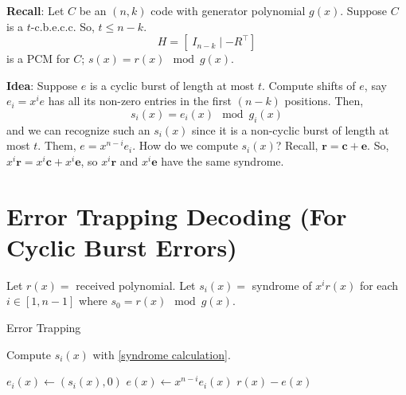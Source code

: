 \textbf{Recall}: Let $ C $ be an $ (n,k) $ code with generator polynomial
$ g(x) $. Suppose $ C $ is a $ t $-c.b.e.c.c. So, $ t\leqslant n-k $.
\[ H=\left[ \; I_{n-k}\mid -R^\top \right] \]
is a PCM for $ C $; $ s(x)=r(x)\mod g(x) $.

\textbf{Idea}: Suppose $ e $ is a cyclic burst of length at most $ t $.
Compute shifts of $ e $, say $ e_i=x^i e $ has all its non-zero entries in the first
$ (n-k) $ positions. Then,
\[ s_i(x)=e_i(x)\mod g_i(x) \]
and we can recognize such an $ s_i(x) $ since it is a non-cyclic burst of length
at most $ t $. Them, $ e=x^{n-i}e_i $. How do we compute $ s_i(x) $? Recall,
$ \bm{r}=\bm{c}+\bm{e} $. So, $ x^i \bm{r}=x^i\bm{c}+x^i\bm{e} $, so
$ x^i \bm{r} $ and $ x^i\bm{e} $ have the same syndrome.

\section{Error Trapping Decoding (For Cyclic Burst Errors)}
Let $ r(x)= $ received polynomial. Let $ s_i(x)= $ syndrome of $ x^i r(x) $ for
each $ i\in[1,n-1] $ where $ s_0=r(x)\mod g(x) $.

\begin{algbox}
    \begin{algorithm}[H]
        \DontPrintSemicolon
        \caption{Error Trapping}

         {
            Compute $ s_i(x) $ with \ref{syndrome calculation}.

             {
                $ e_i(x)\gets(s_i(x),0) $\;
                $ e(x)\gets x^{n-i}e_i(x) $\;
                \Return $ r(x)-e(x) $
            }
        }
        \Return
    \end{algorithm}
\end{algbox}

